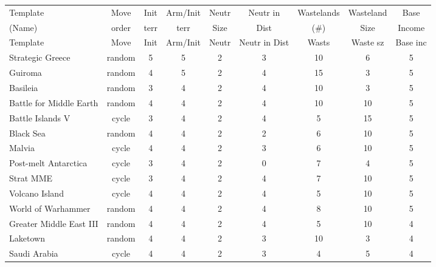 \scriptsize
\begin{longtable}{|l|c|c|c|c|c|c|c|c|}
\hline
\rowcolor{Baby_Blue}
Template & Move & Init & Arm/\newline Init & Neutr & Neutr in & Wastelands & Wasteland & Base \\ 
\rowcolor{Baby_Blue}
(Name)   & order & terr & terr           & Size & Dist & (\#)  & Size & Income \\ \hline\hline
\endfirsthead
\hline
\rowcolor{Baby_Blue}
Template & Move & Init & Arm/\newline Init & Neutr & Neutr in Dist & Wasts & Waste sz & Base inc \\ \hline\hline
\endhead
Strategic Greece            & random & 5 & 5 & 2 & 3 & 10 & 6 & 5 \\ \hline
Guiroma                      & random & 4 & 5 & 2 & 4 & 15 & 3 & 5 \\ \hline \hline \hline
Basileia                     & random & 3 & 4 & 2 & 4 & 10 & 3 & 5 \\ \hline
Battle for Middle Earth      & random & 4 & 4 & 2 & 4 & 10 &10 & 5 \\ \hline
Battle Islands V            & cycle  & 3 & 4 & 2 & 4 & 5  &15 & 5 \\ \hline
Black Sea                    & random & 4 & 4 & 2 & 2 & 6  &10 & 5 \\ \hline
Malvia                       & cycle  & 4 & 4 & 2 & 3 & 6  &10 & 5 \\ \hline
Post-melt Antarctica         & cycle  & 3 & 4 & 2 & 0 & 7  & 4 & 5 \\ \hline
Strat MME                    & cycle  & 3 & 4 & 2 & 4 & 7  &10 & 5 \\ \hline
Volcano Island               & cycle  & 4 & 4 & 2 & 4 & 5  &10 & 5 \\ \hline
World of Warhammer           & random & 4 & 4 & 2 & 4 & 8  &10 & 5 \\ \hline \hline \hline
Greater Middle East III      & random & 4 & 4 & 2 & 4 & 5  &10 & 4 \\ \hline
Laketown                     & random & 4 & 4 & 2 & 3 &10 & 3 & 4 \\ \hline
Saudi Arabia                 & cycle  & 4 & 4 & 2 & 3 & 4 & 5 & 4 \\ \hline

\end{longtable}
